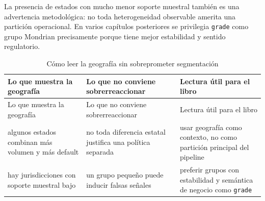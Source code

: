 \documentclass[
  spanish,
  11pt,
  letterpaper,
]{scrbook}
\theoremstyle{plain}
\theoremstyle{remark}
\begin{document}
La presencia de estados con mucho menor soporte muestral también es una
advertencia metodológica: no toda heterogeneidad observable amerita una
partición operacional. En varios capítulos posteriores se privilegia
\texttt{grade} como grupo Mondrian precisamente porque tiene mejor
estabilidad y sentido regulatorio.

\begin{longtable}[]{@{}
  >{\raggedright\arraybackslash}p{}
  >{\raggedright\arraybackslash}p{}
  >{\raggedright\arraybackslash}p{}@{}}
\caption{Cómo leer la geografía sin sobreprometer
segmentación}\label{tbl-geography-reading}\tabularnewline
\toprule\noalign{}
\begin{minipage}[b]{\linewidth}\raggedright
Lo que muestra la geografía
\end{minipage} & \begin{minipage}[b]{\linewidth}\raggedright
Lo que no conviene sobrerreaccionar
\end{minipage} & \begin{minipage}[b]{\linewidth}\raggedright
Lectura útil para el libro
\end{minipage} \\
\midrule\noalign{}
\endfirsthead
\toprule\noalign{}
\begin{minipage}[b]{\linewidth}\raggedright
Lo que muestra la geografía
\end{minipage} & \begin{minipage}[b]{\linewidth}\raggedright
Lo que no conviene sobrerreaccionar
\end{minipage} & \begin{minipage}[b]{\linewidth}\raggedright
Lectura útil para el libro
\end{minipage} \\
\midrule\noalign{}
\endhead
\bottomrule\noalign{}
\endlastfoot
algunos estados combinan más volumen y más default & no toda diferencia
estatal justifica una política separada & usar geografía como contexto,
no como partición principal del pipeline \\
hay jurisdicciones con soporte muestral bajo & un grupo pequeño puede
inducir falsas señales & preferir grupos con estabilidad y semántica de
negocio como \texttt{grade} \\
\end{longtable}
\end{document}
